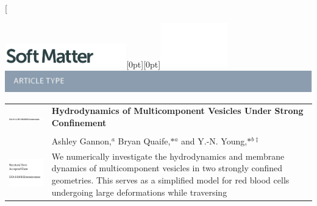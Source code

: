 \documentclass[twoside,twocolumn,9pt]{article}
\begin{document}
\twocolumn[
  \begin{@twocolumnfalse}
{\includegraphics[height=30pt]{head_foot/SM}\hfill\raisebox{0pt}[0pt][0pt]{\includegraphics[height=55pt]{head_foot/RSC_LOGO_CMYK}}\\[1ex]
\includegraphics[width=18.5cm]{head_foot/header_bar}}\par
\vspace{1em}
\sffamily
\begin{tabular}{m{4.5cm} p{13.5cm} }
%
\includegraphics{head_foot/DOI} & \noindent\LARGE{\textbf{Hydrodynamics of Multicomponent Vesicles Under Strong Confinement}} \\
\vspace{0.3cm} & \vspace{0.3cm} \\
%
 & \noindent\large{Ashley Gannon,\textit{$^{a}$} Bryan
  Quaife,\textit{${\ast}${$^{a}$}} and Y.-N.
  Young,\textit{${\ast}$$^{b\ddag}$} } \\
%
\includegraphics{head_foot/dates} & \noindent\normalsize{%
  We numerically investigate the hydrodynamics and membrane dynamics of multicomponent vesicles in two strongly confined geometries. This serves as a simplified model for red blood
  cells undergoing large deformations while traversing %
}
\end{tabular}
\end{@twocolumnfalse}
\end{document}
